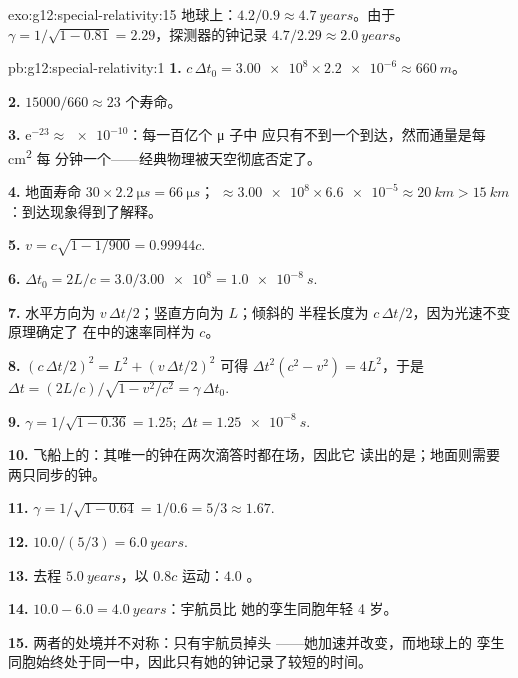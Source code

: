 \begin{solution}{exo:g12:special-relativity:15}
地球上：$4.2/0.9 \approx \qty{4.7}{years}$。由于
$\gamma = 1/\sqrt{1 - 0.81} = 2.29$，探测器的钟记录
$4.7/2.29 \approx \qty{2.0}{years}$。
\end{solution}

\begin{solution}{pb:g12:special-relativity:1}
\textbf{1.} $c\,\Delta t_0 = \num{3.00e8} \times \num{2.2e-6} \approx
\qty{660}{m}$。

\textbf{2.} $\num{15000}/660 \approx 23$ 个寿命。

\textbf{3.} $\mathrm{e}^{-23} \approx \num{e-10}$：每一百亿个 μ 子中
应只有不到一个到达，然而通量是每 \unit{cm^2} 每
分钟一个——经典物理被天空彻底否定了。

\textbf{4.} 地面寿命 $30 \times \qty{2.2}{\micro s} =
\qty{66}{\micro s}$； $\approx \num{3.00e8} \times \num{6.6e-5}
\approx \qty{20}{km} > \qty{15}{km}$：到达现象得到了解释。

\textbf{5.} $v = c\sqrt{1 - 1/900} = 0.99944c$.

\textbf{6.} $\Delta t_0 = 2L/c = 3.0/\num{3.00e8} = \qty{1.0e-8}{s}$.

\textbf{7.} 水平方向为 $v\,\Delta t/2$；竖直方向为 $L$；倾斜的
半程长度为 $c\,\Delta t/2$，因为光速不变原理确定了
在中的速率同样为 $c$。

\textbf{8.} $(c\,\Delta t/2)^2 = L^2 + (v\,\Delta t/2)^2$ 可得
$\Delta t^2(c^2 - v^2) = 4L^2$，于是 $\Delta t =
(2L/c)/\sqrt{1 - v^2/c^2} = \gamma\,\Delta t_0$.

\textbf{9.} $\gamma = 1/\sqrt{1 - 0.36} = 1.25$;
$\Delta t = \qty{1.25e-8}{s}$.

\textbf{10.} 飞船上的：其唯一的钟在两次滴答时都在场，因此它
读出的是；地面则需要两只同步的钟。

\textbf{11.} $\gamma = 1/\sqrt{1 - 0.64} = 1/0.6 = 5/3 \approx 1.67$.

\textbf{12.} $10.0/(5/3) = \qty{6.0}{years}$.

\textbf{13.} 去程 $\qty{5.0}{years}$，以 $0.8c$ 运动：$4.0$ 。

\textbf{14.} $10.0 - 6.0 = \qty{4.0}{years}$：宇航员比
她的孪生同胞年轻 4 岁。

\textbf{15.} 两者的处境并不对称：只有宇航员掉头
——她加速并改变，而地球上的
孪生同胞始终处于同一中，因此只有她的钟记录了较短的时间。


\end{solution}
